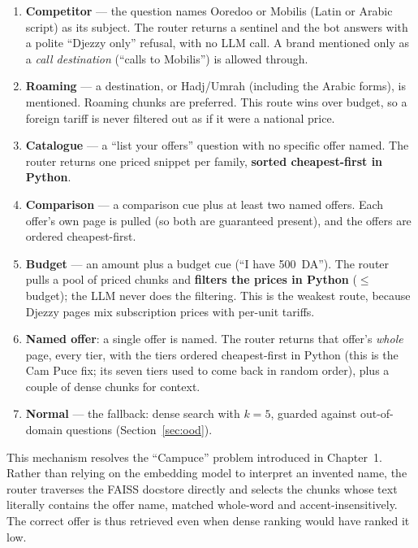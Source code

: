 \documentclass[12pt, a4paper]{report}
\newcommand{\humantext}[1]{#1}      %
\begin{document}
\begin{enumerate}[noitemsep]
    \item \humantext{\textbf{Competitor} --- the question names Ooredoo or Mobilis (Latin or Arabic script) as its subject. The router returns a sentinel and the bot answers with a polite ``Djezzy only'' refusal, with no LLM call. A brand mentioned only as a \emph{call destination} (``calls to Mobilis'') is allowed through.}
    \item \humantext{\textbf{Roaming} --- a destination, or Hadj/Umrah (including the Arabic forms), is mentioned. Roaming chunks are preferred. This route wins over budget, so a foreign tariff is never filtered out as if it were a national price.}
    \item \humantext{\textbf{Catalogue} --- a ``list your offers'' question with no specific offer named. The router returns one priced snippet per family, \textbf{sorted cheapest-first in Python}.}
    \item \humantext{\textbf{Comparison} --- a comparison cue plus at least two named offers. Each offer's own page is pulled (so both are guaranteed present), and the offers are ordered cheapest-first.}
    \item \humantext{\textbf{Budget} --- an amount plus a budget cue (``I have 500~DA''). The router pulls a pool of priced chunks and \textbf{filters the prices in Python} ($\le$ budget); the LLM never does the filtering. This is the weakest route, because Djezzy pages mix subscription prices with per-unit tariffs.}
    \item \humantext{\textbf{Named offer}: a single offer is named. The router returns that offer's \emph{whole} page, every tier, with the tiers ordered cheapest-first in Python (this is the Cam Puce fix; its seven tiers used to come back in random order), plus a couple of dense chunks for context.}
    \item \humantext{\textbf{Normal} --- the fallback: dense search with $k=5$, guarded against out-of-domain questions (Section~\ref{sec:ood}).}
\end{enumerate}

\humantext{This mechanism resolves the ``Campuce'' problem introduced in Chapter~1. Rather than relying on the embedding model to interpret an invented name, the router traverses the FAISS docstore directly and selects the chunks whose text literally contains the offer name, matched whole-word and accent-insensitively. The correct offer is thus retrieved even when dense ranking would have ranked it low.}
\end{document}
